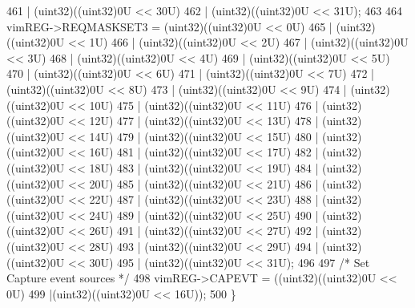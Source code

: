 \begin{DoxyCode}
461                         | (uint32)((uint32)0U << 30U)
462                         | (uint32)((uint32)0U << 31U);
463                         
464     vimREG->REQMASKSET3 = (uint32)((uint32)0U << 0U)
465                         | (uint32)((uint32)0U << 1U)
466                         | (uint32)((uint32)0U << 2U)
467                         | (uint32)((uint32)0U << 3U)
468                         | (uint32)((uint32)0U << 4U)
469                         | (uint32)((uint32)0U << 5U)
470                         | (uint32)((uint32)0U << 6U)
471                         | (uint32)((uint32)0U << 7U)
472                         | (uint32)((uint32)0U << 8U)
473                         | (uint32)((uint32)0U << 9U)
474                         | (uint32)((uint32)0U << 10U)
475                         | (uint32)((uint32)0U << 11U)
476                         | (uint32)((uint32)0U << 12U)
477                         | (uint32)((uint32)0U << 13U)
478                         | (uint32)((uint32)0U << 14U)
479                         | (uint32)((uint32)0U << 15U)
480                         | (uint32)((uint32)0U << 16U)
481                         | (uint32)((uint32)0U << 17U)
482                         | (uint32)((uint32)0U << 18U)
483                         | (uint32)((uint32)0U << 19U)
484                         | (uint32)((uint32)0U << 20U)
485                         | (uint32)((uint32)0U << 21U)
486                         | (uint32)((uint32)0U << 22U)
487                         | (uint32)((uint32)0U << 23U)
488                         | (uint32)((uint32)0U << 24U)
489                         | (uint32)((uint32)0U << 25U)
490                         | (uint32)((uint32)0U << 26U)
491                         | (uint32)((uint32)0U << 27U)
492                         | (uint32)((uint32)0U << 28U)
493                         | (uint32)((uint32)0U << 29U)
494                         | (uint32)((uint32)0U << 30U)
495                         | (uint32)((uint32)0U << 31U);    
496 
497     \textcolor{comment}{/* Set Capture event sources */}
498     vimREG->CAPEVT = ((uint32)((uint32)0U << 0U)
499                      |(uint32)((uint32)0U << 16U));
500 \}
\end{DoxyCode}
